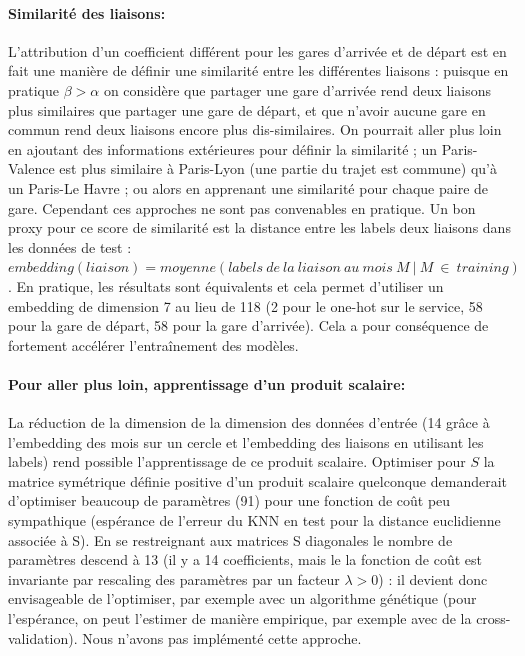\documentclass{article}
\begin{document}
\paragraph{Similarité des liaisons:}

L'attribution d'un coefficient différent pour les gares d'arrivée et de départ est en fait une manière de définir une similarité entre les différentes liaisons : puisque en pratique $\beta > \alpha$ on considère que partager une gare d'arrivée rend deux liaisons plus similaires que partager une gare de départ, et que n'avoir aucune gare en commun rend deux liaisons encore plus dis-similaires. On pourrait aller plus loin en ajoutant des informations extérieures pour définir la similarité ; un Paris-Valence est plus similaire à Paris-Lyon (une partie du trajet est commune) qu'à un Paris-Le Havre ; ou alors en apprenant une similarité pour chaque paire de gare. Cependant ces approches ne sont pas convenables en pratique. Un bon proxy pour ce score de similarité est la distance entre les labels deux liaisons dans les données de test : $embedding(liaison) = moyenne( labels~de~la~liaison~au~mois~M~|~M~\in~training )$. En pratique, les résultats sont équivalents et cela permet d'utiliser un embedding de dimension 7 au lieu de 118 (2 pour le one-hot sur le service, 58 pour la gare de départ, 58 pour la gare d'arrivée). Cela a pour conséquence de fortement accélérer l'entraînement des modèles.

\paragraph{Pour aller plus loin, apprentissage d'un produit scalaire:}

La réduction de la dimension de la dimension des données d'entrée (14 grâce à l'embedding des mois sur un cercle et l'embedding des liaisons en utilisant les labels) rend possible l'apprentissage de ce produit scalaire. Optimiser pour $S$ la matrice symétrique définie positive d'un produit scalaire quelconque demanderait d'optimiser beaucoup de paramètres (91) pour une fonction de coût peu sympathique (espérance de l'erreur du KNN en test pour la distance euclidienne associée à S). En se restreignant aux matrices S diagonales le nombre de paramètres descend à 13 (il y a 14 coefficients, mais le la fonction de coût est invariante par rescaling des paramètres par un facteur $\lambda > 0$) : il devient donc envisageable de l'optimiser, par exemple avec un algorithme génétique (pour l'espérance, on peut l'estimer de manière empirique, par exemple avec de la cross-validation). Nous n'avons pas implémenté cette approche.
\end{document}
